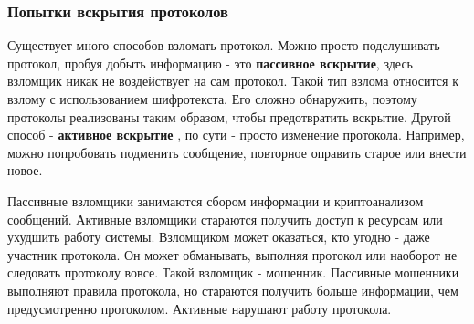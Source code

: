 \documentclass[a4paper]{article}
\begin{document}
\subsubsection{Попытки вскрытия протоколов}
Существует много способов взломать протокол. Можно просто подслушивать протокол, пробуя добыть информацию - это \textbf{пассивное вскрытие}, здесь взломщик никак не воздействует на сам протокол.
Такой тип взлома относится к взлому с использованием шифротекста. Его сложно обнаружить, поэтому протоколы реализованы таким образом, чтобы предотвратить вскрытие.
Другой способ - \textbf{активное вскрытие }, по сути - просто изменение протокола. Например, можно попробовать подменить сообщение, повторное оправить старое или внести новое.
\par
Пассивные взломщики занимаются сбором информации и криптоанализом сообщений. Активные взломщики стараются получить доступ к ресурсам или ухудшить работу системы.
Взломщиком может оказаться, кто угодно - даже участник протокола. Он может обманывать, выполняя протокол или наоборот не следовать протоколу вовсе. Такой взломщик - мошенник. Пассивные мошенники выполняют правила протокола, но стараются получить больше информации, чем предусмотренно протоколом.
Активные нарушают работу протокола.
\end{document}
